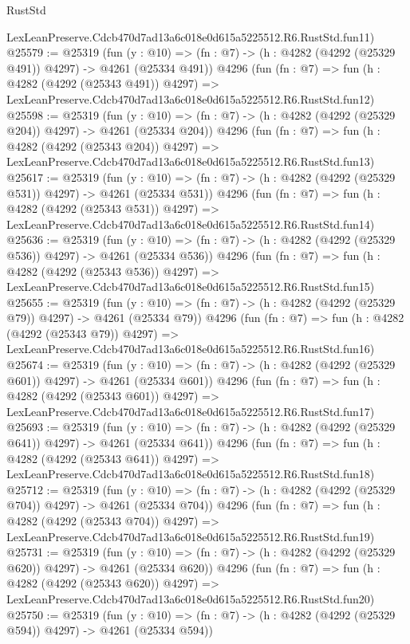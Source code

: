 \begin{lexlean}{RustStd}
\begin{coremodule}
    LexLeanPreserve.Cdcb470d7ad13a6c018e0d615a5225512.R6.RustStd.fun11)
@25579 := @25319
    (fun (y : @10) => (fn : @7) -> (h : @4282 (@4292 (@25329 @491)) @4297) -> @4261 (@25334 @491))
    @4296
    (fun (fn : @7) =>
    fun (h : @4282 (@4292 (@25343 @491)) @4297) =>
    LexLeanPreserve.Cdcb470d7ad13a6c018e0d615a5225512.R6.RustStd.fun12)
@25598 := @25319
    (fun (y : @10) => (fn : @7) -> (h : @4282 (@4292 (@25329 @204)) @4297) -> @4261 (@25334 @204))
    @4296
    (fun (fn : @7) =>
    fun (h : @4282 (@4292 (@25343 @204)) @4297) =>
    LexLeanPreserve.Cdcb470d7ad13a6c018e0d615a5225512.R6.RustStd.fun13)
@25617 := @25319
    (fun (y : @10) => (fn : @7) -> (h : @4282 (@4292 (@25329 @531)) @4297) -> @4261 (@25334 @531))
    @4296
    (fun (fn : @7) =>
    fun (h : @4282 (@4292 (@25343 @531)) @4297) =>
    LexLeanPreserve.Cdcb470d7ad13a6c018e0d615a5225512.R6.RustStd.fun14)
@25636 := @25319
    (fun (y : @10) => (fn : @7) -> (h : @4282 (@4292 (@25329 @536)) @4297) -> @4261 (@25334 @536))
    @4296
    (fun (fn : @7) =>
    fun (h : @4282 (@4292 (@25343 @536)) @4297) =>
    LexLeanPreserve.Cdcb470d7ad13a6c018e0d615a5225512.R6.RustStd.fun15)
@25655 := @25319
    (fun (y : @10) => (fn : @7) -> (h : @4282 (@4292 (@25329 @79)) @4297) -> @4261 (@25334 @79))
    @4296
    (fun (fn : @7) =>
    fun (h : @4282 (@4292 (@25343 @79)) @4297) =>
    LexLeanPreserve.Cdcb470d7ad13a6c018e0d615a5225512.R6.RustStd.fun16)
@25674 := @25319
    (fun (y : @10) => (fn : @7) -> (h : @4282 (@4292 (@25329 @601)) @4297) -> @4261 (@25334 @601))
    @4296
    (fun (fn : @7) =>
    fun (h : @4282 (@4292 (@25343 @601)) @4297) =>
    LexLeanPreserve.Cdcb470d7ad13a6c018e0d615a5225512.R6.RustStd.fun17)
@25693 := @25319
    (fun (y : @10) => (fn : @7) -> (h : @4282 (@4292 (@25329 @641)) @4297) -> @4261 (@25334 @641))
    @4296
    (fun (fn : @7) =>
    fun (h : @4282 (@4292 (@25343 @641)) @4297) =>
    LexLeanPreserve.Cdcb470d7ad13a6c018e0d615a5225512.R6.RustStd.fun18)
@25712 := @25319
    (fun (y : @10) => (fn : @7) -> (h : @4282 (@4292 (@25329 @704)) @4297) -> @4261 (@25334 @704))
    @4296
    (fun (fn : @7) =>
    fun (h : @4282 (@4292 (@25343 @704)) @4297) =>
    LexLeanPreserve.Cdcb470d7ad13a6c018e0d615a5225512.R6.RustStd.fun19)
@25731 := @25319
    (fun (y : @10) => (fn : @7) -> (h : @4282 (@4292 (@25329 @620)) @4297) -> @4261 (@25334 @620))
    @4296
    (fun (fn : @7) =>
    fun (h : @4282 (@4292 (@25343 @620)) @4297) =>
    LexLeanPreserve.Cdcb470d7ad13a6c018e0d615a5225512.R6.RustStd.fun20)
@25750 := @25319
    (fun (y : @10) => (fn : @7) -> (h : @4282 (@4292 (@25329 @594)) @4297) -> @4261 (@25334 @594))

\end{coremodule}
\end{lexlean}

